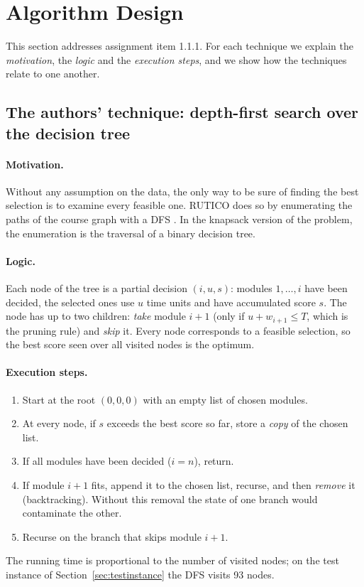 \section{Algorithm Design}\label{sec:design}

This section addresses assignment item 1.1.1. For each technique we explain the \emph{motivation}, the \emph{logic} and the \emph{execution steps}, and we show how the techniques relate to one another.

\subsection{The authors' technique: depth-first search over the decision tree}\label{sec:design-dfs}

\paragraph{Motivation.} Without any assumption on the data, the only way to be sure of finding the best selection is to examine every feasible one. RUTICO does so by enumerating the paths of the course graph with a DFS \cite{nabizadeh2017rutico}. In the knapsack version of the problem, the enumeration is the traversal of a binary decision tree.

\paragraph{Logic.} Each node of the tree is a partial decision $(i, u, s)$: modules $1,\dots,i$ have been decided, the selected ones use $u$ time units and have accumulated score $s$. The node has up to two children: \emph{take} module $i+1$ (only if $u+w_{i+1}\le T$, which is the pruning rule) and \emph{skip} it. Every node corresponds to a feasible selection, so the best score seen over all visited nodes is the optimum.

\paragraph{Execution steps.}
\begin{enumerate}[leftmargin=1.6em,itemsep=1pt]
\item Start at the root $(0,0,0)$ with an empty list of chosen modules.
\item At every node, if $s$ exceeds the best score so far, store a \emph{copy} of the chosen list.
\item If all modules have been decided ($i=n$), return.
\item If module $i+1$ fits, append it to the chosen list, recurse, and then \emph{remove} it (backtracking). Without this removal the state of one branch would contaminate the other.
\item Recurse on the branch that skips module $i+1$.
\end{enumerate}
The running time is proportional to the number of visited nodes; on the test instance of Section~\ref{sec:testinstance} the DFS visits 93 nodes.

